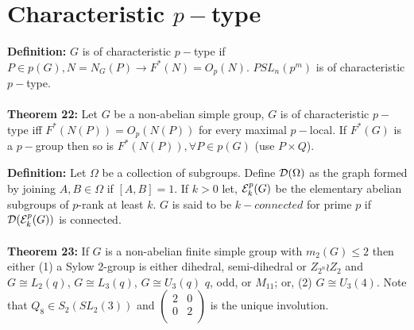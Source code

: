 \section {Characteristic $p-$type}
{\bf Definition:}
$G$ is of characteristic $p-$type if $P \in p(G), N= N_G(P) \rightarrow F^*(N)=O_p(N)$.
$PSL_n(p^m)$ is of characteristic $p-$type.  
\\
\\
{\bf Theorem 22:} Let $G$ be a non-abelian simple group,
$G$ is of characteristic $p-$type iff $F^*(N(P))= O_p(N(P))$ for every maximal $p-$local.
If $F^*(G)$ is a $p-$group then so is $F^*(N(P)), \forall P \in p(G)$ (use $P \times Q$).
\begin{quote}
\end{quote}
{\bf Definition:}
Let $\Omega$ be a collection of subgroups.  Define ${\cal D} (\Omega)$ as the graph
formed by joining $A,B \in \Omega$ if $[A,B]=1$. If $k > 0$ let, 
${\cal E}^p_k (G)$
be the elementary abelian subgroups of $p$-rank at least $k$. $G$ is said to be
$k-connected$ for prime $p$ if ${\cal D} ( {\cal E}^p_k (G))$
is connected.
\\
\\
{\bf Theorem 23:}
If $G$ is a non-abelian finite simple group
with $m_2(G) \le 2$ then either (1) a Sylow 2-group is either dihedral, semi-dihedral
or $Z_{2^n} \wr Z_2$ and
$G \cong L_2(q)$,
$G \cong L_3(q)$,
$G \cong U_3(q)$ $q$, odd, or $M_{11}$; or,  (2)
$G \cong U_3(4)$.
Note that $Q_8 \in S_2(SL_2(3))$ and 
$\left(
\begin{array}{cc}
2 &  0 \\
0 &  2 \\
\end{array}
\right)$ is the unique involution.
\begin{quote}
\end{quote}
